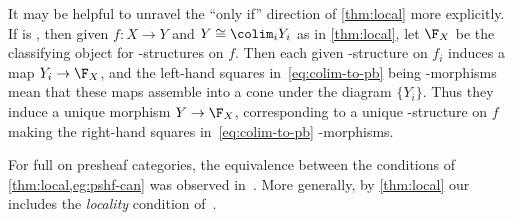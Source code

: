 \begin{verbose}
It may be helpful to unravel the ``only if'' direction of \cref{thm:local} more explicitly.
If \F is \local, then given $f:X\to Y$ and $Y \cong \colim_i Y_i$ as in \cref{thm:local}, let $\F_X$ be the classifying object for \F-structures on $f$.
Then each given \F-structure on $f_i$ induces a map $Y_i \to \F_X$, and the left-hand squares in~\eqref{eq:colim-to-pb} being \F-morphisms mean that these maps assemble into a cone under the diagram $\{Y_i\}$.
Thus they induce a unique morphism $Y\to \F_X$, corresponding to a unique \F-structure on $f$ making the right-hand squares in~\eqref{eq:colim-to-pb} \F-morphisms.
\end{verbose}

\begin{rmk}
  For full \nfss on presheaf categories, the equivalence between the conditions of \cref{thm:local,eg:pshf-can} was observed in~\cite[Remark 4.4]{sattler:eqvext}.
  More generally, by \cref{thm:local} our \locality includes the \emph{locality} condition of~\cite[(A.2)]{sattler:eqvext}.
\end{rmk}

